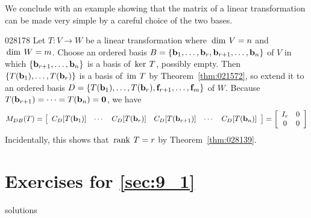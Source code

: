 We conclude with an example showing that the matrix of a linear transformation can be made very simple by a careful choice of the two bases.


\begin{example}{}{028178}
Let $T : V \to W$ be a linear transformation where $\thinspace\operatorname{dim \medspace}V = n$ and $\thinspace\operatorname{dim \medspace}W = m$. Choose an ordered basis $B = \{\textbf{b}_{1}, \dots, \textbf{b}_{r}, \textbf{b}_{r+1}, \dots, \textbf{b}_{n}\}$ of $V$ in which $\{\textbf{b}_{r+1}, \dots, \textbf{b}_{n}\}$ is a basis of $\thinspace\operatorname{ker \medspace}T$, possibly empty. Then $\{T(\textbf{b}_{1}), \dots, T(\textbf{b}_{r})\}$ is a basis of $\thinspace\operatorname{im \medspace}T$ by Theorem~\ref{thm:021572}, so extend it to an ordered basis $D = \{T(\textbf{b}_{1}), \dots, T(\textbf{b}_{r}), \textbf{f}_{r+1}, \dots, \textbf{f}_{m}\}$ of $W$. Because $T(\textbf{b}_{r+1}) = \cdots = T(\textbf{b}_{n}) = \textbf{0}$, we have
\begin{equation*}
M_{DB}(T) = \left[ \begin{array}{cccccc} C_D[T(\textbf{b}_1)] & \cdots & C_D[T(\textbf{b}_r)] & C_D[T(\textbf{b}_{r+1})] & \cdots & C_D[T(\textbf{b}_n)] \end{array} \right] = \left[ \begin{array}{cc} I_r & 0 \\ 0 & 0 \end{array} \right]
\end{equation*}
Incidentally, this shows that $\thinspace\operatorname{rank \medspace}T = r$ by Theorem~\ref{thm:028139}.
\end{example}

\section*{Exercises for \ref{sec:9_1}}

\begin{Filesave}{solutions}
\end{Filesave}

